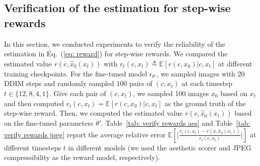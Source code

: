 \begin{figure}[h]
    \centering
    \vspace{-5pt}    
    \label{tab: pick-a-pic}
\end{figure}


\subsection{Verification of the estimation for step-wise rewards}
\label{subsec: verify step-wise reward}

In this section, we conducted experiments to verify the reliability of the estimation in Eq.~(\ref{eq: reward}) for step-wise rewards. We compared the estimated value $r(c,\hat{x}_0(x_t))$ with  $r_t(c,x_t)\triangleq \mathbb{E}[r(c,x_0)|c,x_t]$ at different training checkpoints. For the fine-tuned model $\epsilon_{\theta'}$, we sampled images with 20 DDIM steps and randomly sampled 100 pairs of $(c,x_t)$ at each timestep $t\in\{12,8,4,1\}$. Give each pair of $(c,x_t)$, we sampled 100 images $x_0$ based on $x_t$ and then computed $r_t(c,x_t)=\mathbb{E}[r(c,x_0)|c,x_t]$ as the ground truth of the step-wise reward. Then, we computed the estimated value $r(c,\hat{x}_0(x_t))$ based on the fine-tuned parameters $\theta'$. Table~\ref{tab: verify rewards aes} and Table~\ref{tab: verify rewards jpeg} report the average relative error $\mathbb{E}[\vert\frac{r_t(c,x_t) - r(x, \hat{x}_0(x_t))}{r_t(c,x_t)}\vert]$ at different timesteps $t$ in different models (we used the aesthetic scorer and JPEG compressibility as the reward model, respectively).

